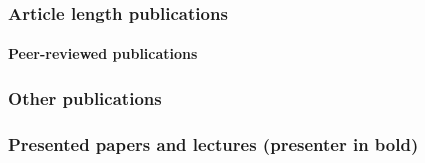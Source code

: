 \subsubsection{Article length publications}



\paragraph{Peer-reviewed publications}

\nocite{*}
\printbibliography[keyword=OaksPeerReviewed, heading=none]

\subsubsection{Other publications}


\subsubsection{Presented papers and lectures (presenter in bold)}





